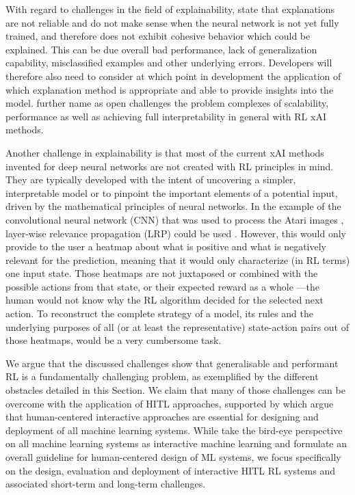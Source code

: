 \documentclass[twoside,11pt]{article}
\begin{document}
With regard to challenges in the field of explainability, \citet{GlanoisEtAl:2021:SurveyInterpretableRL} state that explanations are not reliable and do not make sense when the neural network is not yet fully trained, and therefore does not exhibit cohesive behavior which could be explained. This can be due overall bad performance, lack of generalization capability, misclassified examples and other underlying errors. Developers will therefore also need to consider at which point in development the application of which explanation method is appropriate and able to provide insights into the model. \citet{GlanoisEtAl:2021:SurveyInterpretableRL} further name as open challenges the problem complexes of scalability, performance as well as achieving full interpretability in general with RL xAI methods.

Another challenge in explainability is that most of the current xAI methods invented for deep neural networks are not created with RL principles in mind. They are typically developed with the intent of uncovering a simpler, interpretable model or to pinpoint the important elements of a potential input, driven by the mathematical principles of neural networks. In the example of the convolutional neural network (CNN) that was used to process the Atari images \citep{Mnih:2013:PlayingAtariDeepRL}, layer-wise relevance propagation (LRP) could be used \citep{Bach:2015:LayerWiseRelevancePropagation,Alber:2019:Innvestigate}. However, this would only provide to the user a heatmap about what is positive and what is negatively relevant for the prediction, meaning that it would only characterize (in RL terms) one input state. Those heatmaps are not juxtaposed or combined with the possible actions from that state, or their expected reward as a whole ---the human would not know why the RL algorithm decided for the selected next action. To reconstruct the complete strategy of a model, its rules and the underlying purposes of all (or at least the representative) state-action pairs out of those heatmaps, would be a very cumbersome task. 

We argue that the discussed challenges show that generalisable and performant RL is a fundamentally challenging problem, as exemplified by the different obstacles detailed in this Section. We claim that many of those challenges can be overcome with the application of HITL approaches, supported by \citet{MatthewsonPilarski:2022:DesigningAndEvaluatingHCIML} which argue that human-centered interactive approaches are essential for designing and deployment of all machine learning systems. While \citet{MatthewsonPilarski:2022:DesigningAndEvaluatingHCIML} take the bird-eye perspective on all machine learning systems as interactive machine learning and formulate an overall guideline for human-centered design of ML systems, we focus specifically on the design, evaluation and deployment of interactive HITL RL systems and associated short-term and long-term challenges.
\end{document}
